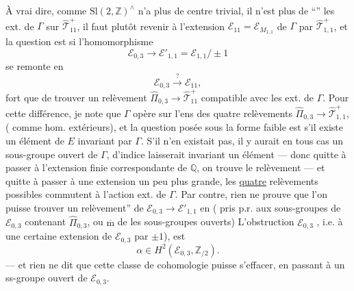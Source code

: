 À vrai dire, comme $\mathrm{Sl}(2,\mathbb Z)^{\wedge}$ n'a plus de centre trivial, il n'est plus   de  ``''  les  ext. de $\Gamma$ sur $\widehat{\mathcal T}_{11}^{+}$, il faut plutôt revenir à l'extension $\mathcal E_{11}=\mathcal E_{M_{1,1}}$ de $\Gamma$ par $\widehat{\mathcal T}_{1,1}^{+}$, et la question est si l'homomorphisme
\[
\mathcal E_{0,3}\longrightarrow\mathcal E'_{1,1}=\mathcal E_{1,1}/\pm1
\]
se remonte en
\[
\mathcal E_{0,3}\xrightarrow{?}\mathcal E_{11},
\]
 fort que de trouver un relèvement $\widehat{\Pi}_{0,3}\longrightarrow\widehat{\mathcal T}_{11}^{+}$ compatible avec les  ext. de $\Gamma$. Pour  cette différence, je note que $\Gamma$ opère sur l'ens des quatre relèvements  $\widehat{\Pi}_{0,3}\longrightarrow\widehat{\mathcal T}_{1,1}^{+}$, ( comme hom. extérieurs), et la
question posée sous la forme faible est s'il existe un élément de $E$ invariant par $\Gamma$. S'il n'en existait pas, il y aurait en tous cas un sous-groupe ouvert de $\Gamma$, d'indice    laisserait invariant un élément --- donc quitte à passer à l'extension  finie correspondante de $\mathbb Q$, on trouve le relèvement --- et quitte à passer à une extension un peu plus grande, les \uline{quatre} relèvements possibles commutent à l'action ext. de $\Gamma$. Par contre, rien ne prouve que l'on puisse trouver un  relèvement''  de $\mathcal E_{0,3}\longrightarrow\mathcal E'_{1,1}$ en  ( pris p.r. aux sous-groupes  de $\mathcal E_{0,3}$  contenant $\widehat\Pi_{0,3}$, ou $\overline{\mathrm m}$ de  les sous-groupes ouverts) L'obstruction  $\mathcal E_{0,3}$ , i.e. à \uline{} une certaine extension de $\mathcal E_{0,3}$ par  $\pm1$), est
\[
\alpha\in H^2(\mathcal E_{0,3},\mathbb Z_{/2}). \tag{36}
\]
--- et rien ne dit que cette classe de cohomologie puisse s'effacer, en passant à un ss-groupe ouvert de $\mathcal E_{0,3}$.

